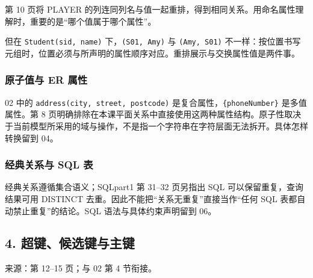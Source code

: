 第 10 页将 PLAYER 的列连同列名与值一起重排，得到相同关系。用命名属性理解时，重要的是``哪个值属于哪个属性''。

但在 \texttt{Student(\allowbreak{}sid,\allowbreak{}\ name)\allowbreak{}} 下，\texttt{(\allowbreak{}S01,\allowbreak{}\ Amy)\allowbreak{}} 与 \texttt{(\allowbreak{}Amy,\allowbreak{}\ S01)\allowbreak{}} 不一样：按位置书写元组时，位置必须与所声明的属性顺序对应。重排展示与交换属性值是两件事。

\subsubsection{原子值与 ER 属性}\label{03_relational_model_and_integrity_zh-ux539fux5b50ux503cux4e0e-er-ux5c5eux6027}

02 中的 \texttt{address(\allowbreak{}city,\allowbreak{}\ street,\allowbreak{}\ postcode)\allowbreak{}} 是复合属性，\texttt{\{phoneNumber\}} 是多值属性。第 8 页明确排除在本课平面关系中直接使用这两种属性结构。原子性取决于当前模型所采用的域与操作，不是指一个字符串在字符层面无法拆开。具体怎样转换留到 04。

\subsubsection{经典关系与 SQL 表}\label{03_relational_model_and_integrity_zh-ux7ecfux5178ux5173ux7cfbux4e0e-sql-ux8868}

经典关系遵循集合语义；SQLpart1 第 31--32 页另指出 SQL 可以保留重复，查询结果可用 DISTINCT 去重。因此不能把``关系无重复''直接当作``任何 SQL 表都自动禁止重复''的结论。SQL 语法与具体约束声明留到 06。

\subsection{4. 超键、候选键与主键}\label{03_relational_model_and_integrity_zh-ux8d85ux952eux5019ux9009ux952eux4e0eux4e3bux952e}

来源：第 12--15 页；与 02 第 4 节衔接。

